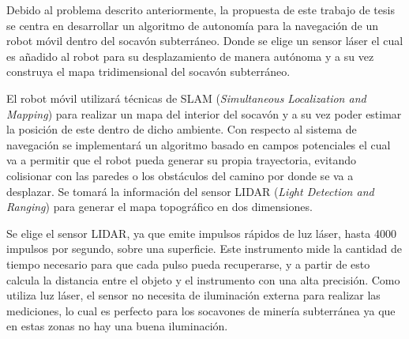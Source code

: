 

Debido al problema descrito anteriormente, la propuesta de este trabajo de tesis 
se centra en desarrollar un algoritmo de autonomía para la navegaci\'on de un robot 
m\'ovil dentro del socav\'on subterr\'aneo. Donde se elige un sensor l\'aser el 
cual es añadido al robot para su desplazamiento de manera aut\'onoma y a su vez 
construya el mapa tridimensional del socavón subterr\'aneo.

El robot m\'ovil utilizar\'a t\'ecnicas de SLAM (\textit{Simultaneous Localization 
and Mapping}) para realizar un mapa del interior del socav\'on y a su vez poder 
estimar la posici\'on de este dentro de dicho ambiente. Con respecto al sistema 
de navegaci\'on se implementar\'a un algoritmo basado en campos potenciales el 
cual va a permitir que el robot pueda generar su propia trayectoria, evitando 
colisionar con las paredes o los obst\'aculos del camino por donde se va a 
desplazar. Se tomar\'a la informaci\'on del sensor LIDAR (\textit{Light 
Detection and Ranging}) para generar el mapa topogr\'afico en dos dimensiones.

Se elige el sensor LIDAR, ya que emite impulsos r\'apidos de luz l\'aser, hasta 
4000 impulsos por segundo, sobre una superficie. Este instrumento mide la 
cantidad de tiempo necesario para que cada pulso pueda recuperarse, y a partir 
de esto calcula la distancia entre el objeto y el instrumento con una alta 
precisi\'on. Como utiliza luz l\'aser, el sensor no necesita de iluminaci\'on 
externa para realizar las mediciones, lo cual es perfecto para los socavones 
de miner\'ia subterránea ya que en estas zonas no hay una buena iluminaci\'on. 

